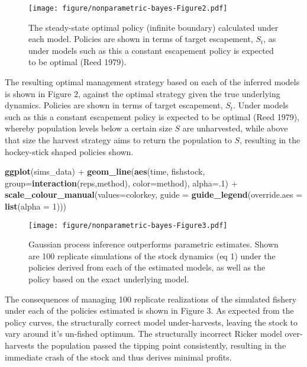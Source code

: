\documentclass[author-year, review]{elsarticle} %
\makeatletter
\newenvironment{Shaded}{}{}
\newcommand{\KeywordTok}[1]{\textcolor[rgb]{0.00,0.44,0.13}{\textbf{{#1}}}}
\newcommand{\DataTypeTok}[1]{\textcolor[rgb]{0.56,0.13,0.00}{{#1}}}
\newcommand{\DecValTok}[1]{\textcolor[rgb]{0.25,0.63,0.44}{{#1}}}
\newcommand{\StringTok}[1]{\textcolor[rgb]{0.25,0.44,0.63}{{#1}}}
\newcommand{\NormalTok}[1]{{#1}}
\def\maxwidth{\ifdim\Gin@nat@width>\linewidth\linewidth
\else\Gin@nat@width\fi}
\let\Oldincludegraphics\includegraphics
\renewcommand{\includegraphics}[1]{\Oldincludegraphics[width=\maxwidth]{#1}}
\makeatother
\begin{document}
\begin{figure}[htbp]
\centering
\texttt{[image: figure/nonparametric-bayes-Figure2.pdf]}
\caption{The steady-state optimal policy (infinite boundary) calculated
under each model. Policies are shown in terms of target escapement,
$S_t$, as under models such as this a constant escapement policy is
expected to be optimal (Reed 1979).}
\end{figure}

The resulting optimal management strategy based on each of the inferred
models is shown in Figure 2, against the optimal strategy given the true
underlying dynamics. Policies are shown in terms of target escapement,
$S_t$. Under models such as this a constant escapement policy is
expected to be optimal (Reed 1979), whereby population levels below a
certain size $S$ are unharvested, while above that size the harvest
strategy aims to return the population to $S$, resulting in the
hockey-stick shaped policies shown.

\begin{Shaded}
\begin{Highlighting}[]
\KeywordTok{ggplot}\NormalTok{(sims_data) +}\StringTok{ }
\StringTok{  }\KeywordTok{geom_line}\NormalTok{(}\KeywordTok{aes}\NormalTok{(time, fishstock, }\DataTypeTok{group=}\KeywordTok{interaction}\NormalTok{(reps,method), }\DataTypeTok{color=}\NormalTok{method), }\DataTypeTok{alpha=}\NormalTok{.}\DecValTok{1}\NormalTok{) +}
\StringTok{  }\KeywordTok{scale_colour_manual}\NormalTok{(}\DataTypeTok{values=}\NormalTok{colorkey, }\DataTypeTok{guide =} \KeywordTok{guide_legend}\NormalTok{(}\DataTypeTok{override.aes =} \KeywordTok{list}\NormalTok{(}\DataTypeTok{alpha =} \DecValTok{1}\NormalTok{)))}
\end{Highlighting}
\end{Shaded}

\begin{figure}[htbp]
\centering
\texttt{[image: figure/nonparametric-bayes-Figure3.pdf]}
\caption{Gaussian process inference outperforms parametric estimates.
Shown are 100 replicate simulations of the stock dynamics (eq 1) under
the policies derived from each of the estimated models, as well as the
policy based on the exact underlying model.}
\end{figure}

The consequences of managing 100 replicate realizations of the simulated
fishery under each of the policies estimated is shown in Figure 3. As
expected from the policy curves, the structurally correct model
under-harvests, leaving the stock to vary around it's un-fished optimum.
The structurally incorrect Ricker model over-harvests the population
passed the tipping point consistently, resulting in the immediate crash
of the stock and thus derives minimal profits.
\end{document}
